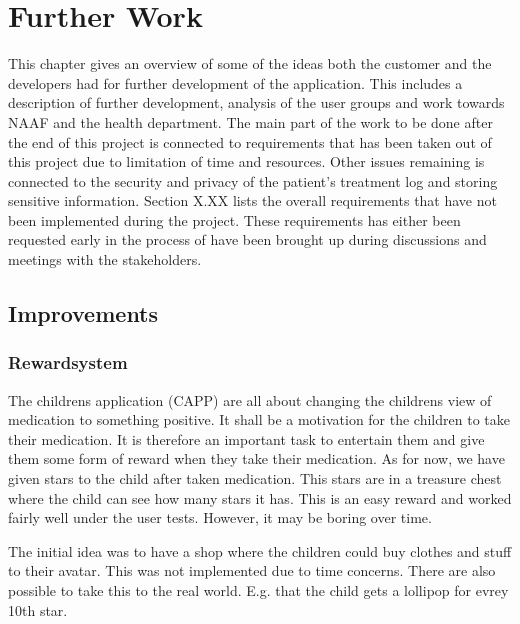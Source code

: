 \chapter{Further Work}
\label{chap:Further Work}

This chapter gives an overview of some of the ideas both the customer and the developers had for further development of the application. This includes a description of further development, analysis of the user groups and work towards NAAF and the health department.
The main part of the work to be done after the end of this project is connected to requirements that has been taken out of this project due to limitation of time and resources. Other issues remaining is connected to the security and privacy of the patient's treatment log and storing sensitive information.
Section X.XX lists the overall requirements that have not been implemented during the project. These requirements has either been requested early in the process of have been brought up during discussions and meetings with the stakeholders. 

\section{Improvements}






\subsection{Rewardsystem}
The childrens application (CAPP) are all about changing the childrens view of medication to something positive. It shall be a motivation for the children to take their medication. It is therefore an important task to entertain them and give them some form of reward when they take their medication. As for now, we have given stars to the child after taken medication. This stars are in a treasure chest where the child can see how many stars it has. This is an easy reward and worked fairly well under the user tests. However, it may be boring over time. 

The initial idea was to have a shop where the children could buy clothes and stuff to their avatar. This was not implemented due to time concerns. There are also possible to take this to the real world. E.g. that the child gets a lollipop for evrey 10th star. 
 
